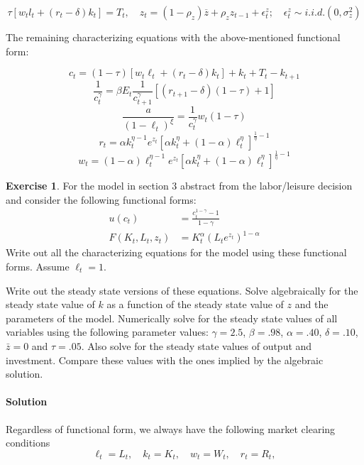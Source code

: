 \documentclass[letterpaper,12pt]{article}
\theoremstyle{definition}
\newtheorem{exercise}[theorem]{Exercise}
\begin{document}
\begin{spacing}{1.5}
$$ \tau [w_tl_t + (r_t - \delta)k_t] = T_t, \quad z_t = ( 1 - \rho_z )\overline{z} + \rho_z z_{t - 1} + \epsilon_t^z; \quad \epsilon_t^z \sim i.i.d.(0, \sigma_z^2)$$

The remaining characterizing equations with the above-mentioned functional form:

$$c_t = (1 - \tau)[w_t\ell_t + (r_t - \delta) k_t] + k_t + T_t - k_{t + 1} $$
$$\frac{1}{c_t^\gamma} = \beta E_t{\frac{1}{c_{t + 1}^\gamma} [ (r_{t + 1} -\delta)(1 - \tau) + 1]} $$
$$ \frac{a}{(1 - \ell_t)^\xi} = \frac{1}{c_t^\gamma} w_t (1 - \tau) $$
$$ r_t = \alpha k_t^{\eta-1} e^{z_t}[\alpha k_t^{\eta}+(1-\alpha)\ell_t^\eta]^{\frac{1}{\eta}-1}$$ 
$$w_t = (1 - \alpha) \ell_t^{\eta-1} e^{z_t}[\alpha k_t^{\eta}+(1-\alpha)\ell_t^\eta]^{\frac{1}{\eta}-1}$$




	\begin{exercise} \label{DSGE_HW_NoLeisure}
		For the model in section 3 abstract from the labor/leisure decision and consider the following functional forms:
		\begin{equation}\label{DSGE_HW_NoLeisure_eq01}
		\begin{split}
		u(c_t) & = \frac{c^{1-\gamma}_t -1}{1-\gamma}      \\
		F(K_t,L_t,z_t) & = K^{\alpha}_t (L_te^{z_t})^{1-\alpha}  \nonumber
		\end{split}
		\end{equation}
		Write out all the characterizing equations for the model using these functional forms.  Assume $\ell_t=1$.

		Write out the steady state versions of these equations.  Solve algebraically for the steady state value of $k$ as a function of the steady state value of $z$ and the parameters of the model.  Numerically solve for the steady state values of all variables using the following parameter values: $\gamma = 2.5$, $\beta = .98$, $\alpha = .40$, $\delta = .10$, $\bar z = 0$ and $\tau = .05$.  Also solve for the steady state values of output and investment.  Compare these values with the ones implied by the algebraic solution.
	\end{exercise}

\paragraph{Solution} Regardless of functional form, we always have the following market clearing conditions
$$\ell_t = L_t, \quad k_t = K_t, \quad w_t = W_t, \quad r_t = R_t ,$$


\end{spacing}
\end{document}

